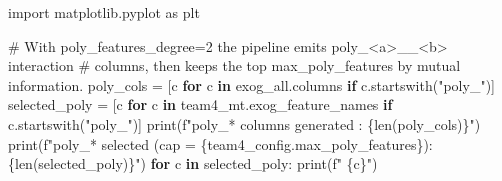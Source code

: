 \documentclass[
  english,
  letterpaper,
]{scrbook}
\newenvironment{Shaded}{\begin{snugshade}}{\end{snugshade}}
\newcommand{\BuiltInTok}[1]{\textcolor[rgb]{0.00,0.23,0.31}{#1}}
\newcommand{\CommentTok}[1]{\textcolor[rgb]{0.37,0.37,0.37}{#1}}
\newcommand{\ControlFlowTok}[1]{\textcolor[rgb]{0.00,0.23,0.31}{\textbf{#1}}}
\newcommand{\ImportTok}[1]{\textcolor[rgb]{0.00,0.46,0.62}{#1}}
\newcommand{\KeywordTok}[1]{\textcolor[rgb]{0.00,0.23,0.31}{\textbf{#1}}}
\newcommand{\NormalTok}[1]{\textcolor[rgb]{0.00,0.23,0.31}{#1}}
\newcommand{\OperatorTok}[1]{\textcolor[rgb]{0.37,0.37,0.37}{#1}}
\newcommand{\SpecialCharTok}[1]{\textcolor[rgb]{0.37,0.37,0.37}{#1}}
\newcommand{\SpecialStringTok}[1]{\textcolor[rgb]{0.13,0.47,0.30}{#1}}
\newcommand{\StringTok}[1]{\textcolor[rgb]{0.13,0.47,0.30}{#1}}
\begin{document}
\begin{Shaded}
\begin{Highlighting}[]
\ImportTok{import}\NormalTok{ matplotlib.pyplot }\ImportTok{as}\NormalTok{ plt}

\CommentTok{\# With poly\_features\_degree=2 the pipeline emits poly\_\textless{}a\textgreater{}\_\_\textless{}b\textgreater{} interaction}
\CommentTok{\# columns, then keeps the top max\_poly\_features by mutual information.}
\NormalTok{poly\_cols }\OperatorTok{=}\NormalTok{ [c }\ControlFlowTok{for}\NormalTok{ c }\KeywordTok{in}\NormalTok{ exog\_all.columns }\ControlFlowTok{if}\NormalTok{ c.startswith(}\StringTok{"poly\_"}\NormalTok{)]}
\NormalTok{selected\_poly }\OperatorTok{=}\NormalTok{ [c }\ControlFlowTok{for}\NormalTok{ c }\KeywordTok{in}\NormalTok{ team4\_mt.exog\_feature\_names }\ControlFlowTok{if}\NormalTok{ c.startswith(}\StringTok{"poly\_"}\NormalTok{)]}
\BuiltInTok{print}\NormalTok{(}\SpecialStringTok{f"poly\_* columns generated : }\SpecialCharTok{\{}\BuiltInTok{len}\NormalTok{(poly\_cols)}\SpecialCharTok{\}}\SpecialStringTok{"}\NormalTok{)}
\BuiltInTok{print}\NormalTok{(}\SpecialStringTok{f"poly\_* selected (cap = }\SpecialCharTok{\{}\NormalTok{team4\_config}\SpecialCharTok{.}\NormalTok{max\_poly\_features}\SpecialCharTok{\}}\SpecialStringTok{): }\SpecialCharTok{\{}\BuiltInTok{len}\NormalTok{(selected\_poly)}\SpecialCharTok{\}}\SpecialStringTok{"}\NormalTok{)}
\ControlFlowTok{for}\NormalTok{ c }\KeywordTok{in}\NormalTok{ selected\_poly:}
    \BuiltInTok{print}\NormalTok{(}\SpecialStringTok{f"  }\SpecialCharTok{\{}\NormalTok{c}\SpecialCharTok{\}}\SpecialStringTok{"}\NormalTok{)}


\end{Highlighting}
\end{Shaded}
\end{document}
